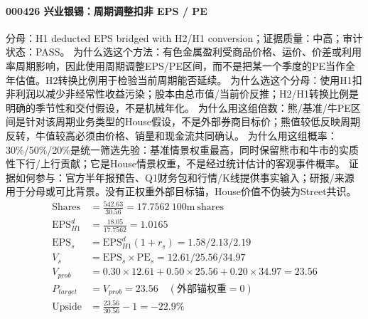 \paragraph{000426 兴业银锡：周期调整扣非 EPS / PE}
分母：H1 deducted EPS bridged with H2/H1 conversion；证据质量：中高；审计状态：PASS。
为什么选这个方法：有色金属盈利受商品价格、运价、价差或利用率周期影响，因此使用周期调整EPS/PE区间，而不是把某一个季度的PE当作全年估值。H2转换比例用于检验当前周期能否延续。
为什么选这个分母：使用H1扣非利润以减少非经常性收益污染；股本由总市值/当前价反推；H2/H1转换比例是明确的季节性和交付假设，不是机械年化。
为什么用这组倍数：熊/基准/牛PE区间是针对该周期业务类型的House假设，不是外部券商目标价；熊值较低反映周期反转，牛值较高必须由价格、销量和现金流共同确认。
为什么用这组概率：30\%/50\%/20\%是统一筛选先验：基准情景权重最高，同时保留熊市和牛市的实质性下行/上行贡献；它是House情景权重，不是经过统计估计的客观事件概率。
证据如何参与：官方半年报预告、Q1财务包和行情/K线提供事实输入；研报/来源用于分母或可比背景。没有正权重外部目标锚，House价值不伪装为Street共识。
\begin{align*}
\mathrm{Shares} &= \frac{542.63}{30.56}=17.7562\ \mathrm{100m\ shares}\\
\mathrm{EPS}_{H1}^d &= \frac{18.05}{17.7562}=1.0165\\
\mathrm{EPS}_s &= \mathrm{EPS}_{H1}^d(1+r_s)=1.58/2.13/2.19\\
V_s &= \mathrm{EPS}_s\times \mathrm{PE}_s=12.61/25.56/34.97\\
V_{prob} &= 0.30\times 12.61+0.50\times 25.56+0.20\times 34.97=23.56\\
P_{target} &= V_{prob}=23.56\quad(\text{外部锚权重}=0)\\
\mathrm{Upside} &= \frac{23.56}{30.56}-1=-22.9\%\\
\end{align*}

